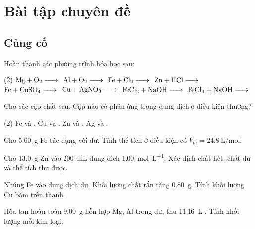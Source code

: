\section{Bài tập chuyên đề}

\subsection{Củng cố}

\begin{tuluyen}
Hoàn thành các phương trình hóa học sau:
\begin{tasks}(2)
\task $\ce{Mg + O2 ->}$
\task $\ce{Al + O2 ->}$
\task $\ce{Fe + Cl2 ->}$
\task $\ce{Zn + HCl ->}$
\task $\ce{Fe + CuSO4 ->}$
\task $\ce{Cu + AgNO3 ->}$
\task $\ce{FeCl2 + NaOH ->}$
\task $\ce{FeCl3 + NaOH ->}$
\end{tasks}
\end{tuluyen}

\begin{tuluyen}
Cho các cặp chất sau. Cặp nào có phản ứng trong dung dịch ở điều kiện thường?
\begin{tasks}(2)
\task Fe và .
\task Cu và .
\task Zn và .
\task Ag và .
\end{tasks}
\end{tuluyen}

\begin{tuluyen}
Cho \SI{5.60}{\gram} Fe tác dụng với  dư. Tính thể tích  ở điều kiện có $V_m=\SI{24.8}{\liter\per\mole}$.
\end{tuluyen}

\begin{tuluyen}
Cho \SI{13.0}{\gram} Zn vào \SI{200}{\milli\liter} dung dịch  \SI{1.00}{\mole\per\liter}. Xác định chất hết, chất dư và thể tích  thu được.
\end{tuluyen}

\begin{tuluyen}
Nhúng Fe vào dung dịch  dư. Khối lượng chất rắn tăng \SI{0.80}{\gram}. Tính khối lượng Cu bám trên thanh.
\end{tuluyen}

\begin{tuluyen}
Hòa tan hoàn toàn \SI{9.00}{\gram} hỗn hợp Mg, Al trong  dư, thu \SI{11.16}{\liter} . Tính khối lượng mỗi kim loại.
\end{tuluyen}

